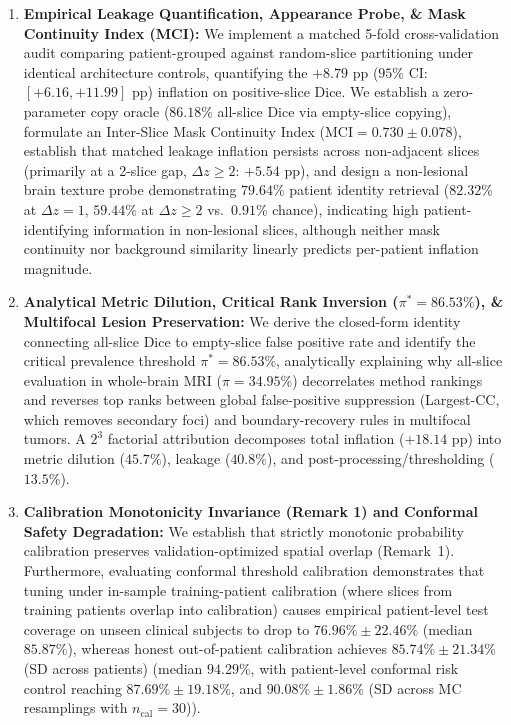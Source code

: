 \documentclass[11pt,a4paper]{article}
\begin{document}
\begin{enumerate}
    \item \textbf{Empirical Leakage Quantification, Appearance Probe, \& Mask Continuity Index (MCI):} We implement a matched 5-fold cross-validation audit comparing patient-grouped against random-slice partitioning under identical architecture controls, quantifying the $+8.79\text{ pp}$ ($95\%$ CI: $[+6.16, +11.99]\text{ pp}$) inflation on positive-slice Dice. We establish a zero-parameter copy oracle ($86.18\%$ all-slice Dice via empty-slice copying), formulate an Inter-Slice Mask Continuity Index ($\text{MCI} = 0.730 \pm 0.078$), establish that matched leakage inflation persists across non-adjacent slices (primarily at a 2-slice gap, $\Delta z \ge 2$: $+5.54\text{ pp}$), and design a non-lesional brain texture probe demonstrating $79.64\%$ patient identity retrieval ($82.32\%$ at $\Delta z = 1$, $59.44\%$ at $\Delta z \ge 2$ vs.\ $0.91\%$ chance), indicating high patient-identifying information in non-lesional slices, although neither mask continuity nor background similarity linearly predicts per-patient inflation magnitude.
    \item \textbf{Analytical Metric Dilution, Critical Rank Inversion ($\pi^* = 86.53\%$), \& Multifocal Lesion Preservation:} We derive the closed-form identity connecting all-slice Dice to empty-slice false positive rate and identify the critical prevalence threshold $\pi^* = 86.53\%$, analytically explaining why all-slice evaluation in whole-brain MRI ($\pi = 34.95\%$) decorrelates method rankings and reverses top ranks between global false-positive suppression (Largest-CC, which removes secondary foci) and boundary-recovery rules in multifocal tumors. A $2^3$ factorial attribution decomposes total inflation ($+18.14\text{ pp}$) into metric dilution ($45.7\%$), leakage ($40.8\%$), and post-processing/thresholding ($13.5\%$).
\item \textbf{Calibration Monotonicity Invariance (Remark 1) and Conformal Safety Degradation:} We establish that strictly monotonic probability calibration preserves validation-optimized spatial overlap (Remark~1). Furthermore, evaluating conformal threshold calibration demonstrates that tuning under in-sample training-patient calibration (where slices from training patients overlap into calibration) causes empirical patient-level test coverage on unseen clinical subjects to drop to $76.96\% \pm 22.46\%$ (median $85.87\%$), whereas honest out-of-patient calibration achieves $85.74\% \pm 21.34\%$ (SD across patients) (median $94.29\%$, with patient-level conformal risk control reaching $87.69\% \pm 19.18\%$, and $90.08\% \pm 1.86\%$ (SD across MC resamplings with $n_{\text{cal}} = 30$)).

\end{enumerate}
\end{document}
